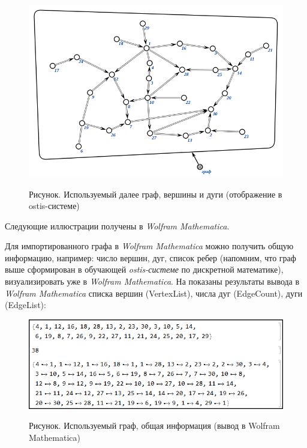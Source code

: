 
\begin{figure}[H]
	\caption{Рисунок. Используемый далее граф, вершины и дуги (отображение в  ostis-системе)}
	\includegraphics[scale=0.9]{images/part7/chapter_integration/integr_alg31a.png}
	\label{fig:integr_alg31}
\end{figure}

Следующие иллюстрации получены в \textit{Wolfram Mathematica}. 

Для импортированного графа в \textit{Wolfram Mathematica} можно получить общую информацию, например: число вершин, дуг, список ребер (напомним, что граф выше сформирован в обучающей \textit{ostis-системе} по дискретной математике), визуализировать уже в \textit{Wolfram Mathematica}. На \textit{}
показаны результаты вывода в \textit{Wolfram Mathematica} списка вершин (VertexList), числа дуг (EdgeCount), дуги (EdgeList):
\begin{figure}[H]
	\caption{Рисунок. Используемый граф, общая информация (вывод в Wolfram Mathematica)}
	\includegraphics[scale=0.65]{images/part7/chapter_integration/integr_alg31d.png}
	\label{fig:integr_alg31d}
\end{figure}

